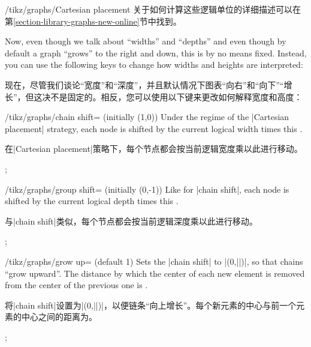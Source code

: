 \begin{key}{/tikz/graphs/Cartesian placement}
    关于如何计算这些逻辑单位的详细描述可以在第\ref{section-library-graphs-new-online}节中找到。

    Now, even though we talk about ``widths'' and ``depths'' and even though by
    default a graph ``grows'' to the right and down, this is by no means fixed.
    Instead, you can use the following keys to change how widths and heights
    are interpreted:
    
    现在，尽管我们谈论“宽度”和“深度”，并且默认情况下图表“向右”和“向下”“增长”，但这决不是固定的。相反，您可以使用以下键来更改如何解释宽度和高度：
%
    \begin{key}{/tikz/graphs/chain shift= (initially {(1,0)})}
        Under the regime of the |Cartesian placement| strategy, each node is
        shifted by the current logical width times this .
        
        在|Cartesian placement|策略下，每个节点都会按当前逻辑宽度乘以此进行移动。%
\begin{codeexample}[preamble={\usetikzlibrary{graphs}}]
\tikz {};
\end{codeexample}
    \end{key}
    \begin{key}{/tikz/graphs/group shift= (initially {(0,-1)})}
        Like for |chain shift|, each node is shifted by the current logical
        depth times this .
        
        与|chain shift|类似，每个节点都会按当前逻辑深度乘以此进行移动。%
\begin{codeexample}[preamble={\usetikzlibrary{graphs}}]
\tikz {};
\end{codeexample}
    \end{key}
\end{key}

\begin{key}{/tikz/graphs/grow up= (default 1)}
    Sets the |chain shift| to |(0,||)|, so that chains ``grow
    upward''. The distance by which the center of each new element is removed
    from the center of the previous one is .
    
    将|chain shift|设置为|(0,||)|，以便链条“向上增长”。每个新元素的中心与前一个元素的中心之间的距离为。%
\begin{codeexample}[preamble={\usetikzlibrary{graphs}}]
\tikz {};
\end{codeexample}
\end{key}

